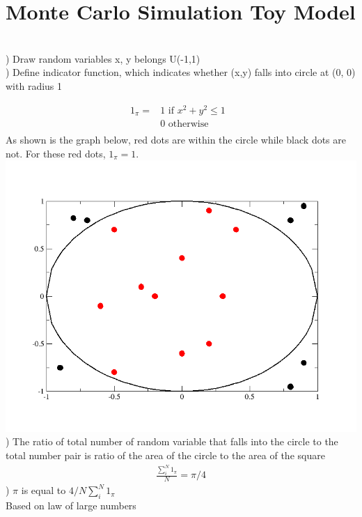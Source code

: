 \documentclass[a4paper]{article}
\begin{document}
\section{Monte Carlo Simulation Toy Model}


\\
) Draw random variables x, y belongs U(-1,1)\\
) Define indicator function, which indicates whether (x,y) falls into circle at (0, 0) with radius 1

\begin{align*}
1_{\pi} = &1 \textrm{ if $x^2 +y^2 \leq 1$ }\\
          &0 \textrm{ otherwise }	\\
\end{align*}
As shown is the graph below, red dots are within the circle while black dots are not. For these red dots, $1_{\pi} = 1$.\\
\includegraphics[scale = 0.5]{pi.png}\\
) The ratio of total number of random variable that falls into the circle  to the total number  pair is ratio of the area of the circle to the area of the square\\
\begin{align*}
\frac{ \sum_i^{N} 1_{\pi}}{N} = \pi/4	
\end{align*}
) $\pi$ is equal to $4/N \sum_i^{N} 1_{\pi}$\\
Based on law of large numbers\\
\end{document}
